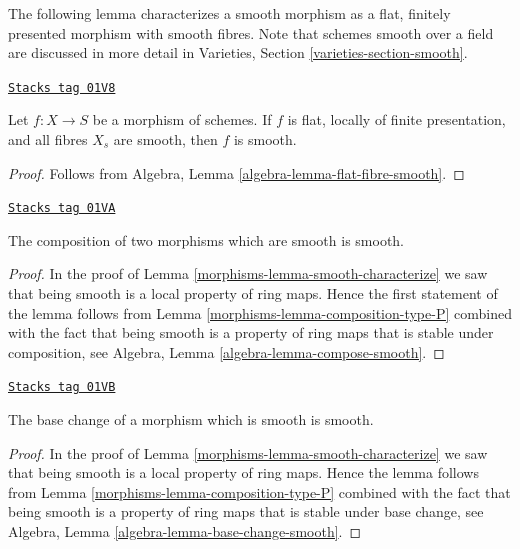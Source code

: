 The following lemma characterizes a smooth morphism as a
flat, finitely presented morphism with smooth fibres.
Note that schemes smooth over a field are discussed in more detail in
Varieties, Section \ref{varieties-section-smooth}.

\begin{lemma}
\label{morphisms-lemma-smooth-flat-smooth-fibres}
\href{https://stacks.math.columbia.edu/tag/01V8}{\texttt{Stacks tag 01V8}}

Let $f : X \to S$ be a morphism of schemes.
If $f$ is flat, locally of finite presentation, and all
fibres $X_s$ are smooth, then $f$
is smooth.
\end{lemma}

\begin{proof}
Follows from Algebra, Lemma \ref{algebra-lemma-flat-fibre-smooth}.
\end{proof}

\begin{lemma}
\label{morphisms-lemma-composition-smooth}
\href{https://stacks.math.columbia.edu/tag/01VA}{\texttt{Stacks tag 01VA}}

The composition of two morphisms which are smooth is smooth.
\end{lemma}

\begin{proof}

In the proof of Lemma \ref{morphisms-lemma-smooth-characterize}
we saw that being smooth is a local property of ring maps.
Hence the first statement of the lemma follows from
Lemma \ref{morphisms-lemma-composition-type-P} combined
with the fact that being smooth is a property of ring maps that is
stable under composition, see
Algebra, Lemma \ref{algebra-lemma-compose-smooth}.
\end{proof}

\begin{lemma}
\label{morphisms-lemma-base-change-smooth}
\href{https://stacks.math.columbia.edu/tag/01VB}{\texttt{Stacks tag 01VB}}

The base change of a morphism which is smooth is smooth.
\end{lemma}

\begin{proof}

In the proof of Lemma \ref{morphisms-lemma-smooth-characterize}
we saw that being smooth is a local property of ring maps.
Hence the lemma follows from
Lemma \ref{morphisms-lemma-composition-type-P} combined
with the fact that being smooth is a property of ring maps that is
stable under base change, see
Algebra, Lemma \ref{algebra-lemma-base-change-smooth}.
\end{proof}

